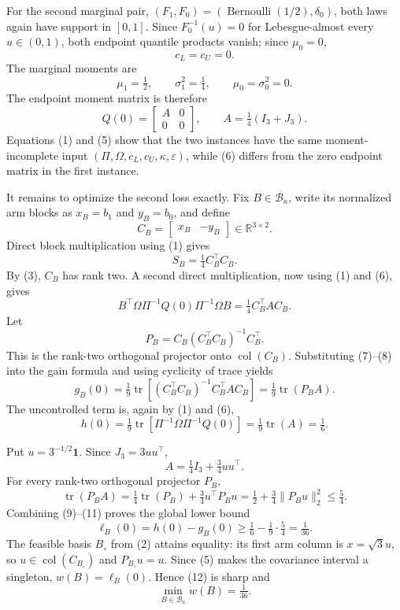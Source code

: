 For the second marginal pair, \((F_1,F_0)=(\operatorname{Bernoulli}(1/2),\delta_0)\), both laws again have support in \([0,1]\).  Since \(F_0^{-1}(u)=0\) for Lebesgue-almost every \(u\in(0,1)\), both endpoint quantile products vanish; since \(\mu_0=0\),
\[
c_L=c_U=0.
\tag{5}
\]
The marginal moments are
\[
\mu_1=\tfrac12,
\qquad
\sigma_1^2=\tfrac14,
\qquad
\mu_0=\sigma_0^2=0.
\]
The endpoint moment matrix is therefore
\[
Q(0)=\begin{bmatrix}A&0\\0&0\end{bmatrix},
\qquad
A=\tfrac14(I_3+J_3).
\tag{6}
\]
Equations (1) and (5) show that the two instances have the same moment-incomplete input \((\Pi,\Omega,c_L,c_U,\kappa,\varepsilon)\), while (6) differs from the zero endpoint matrix in the first instance.

It remains to optimize the second loss exactly.  Fix \(B\in\mathcal B_\kappa\), write its normalized arm blocks as \(x_B=b_1\) and \(y_B=b_0\), and define
\[
C_B=\begin{bmatrix}x_B&-y_B\end{bmatrix}\in\mathbb R^{3\times2}.
\]
Direct block multiplication using (1) gives
\[
S_B=\tfrac14C_B^{\top}C_B.
\tag{7}
\]
By (3), \(C_B\) has rank two.  A second direct multiplication, now using (1) and (6), gives
\[
B^{\top}\Omega\Pi^{-1}Q(0)\Pi^{-1}\Omega B
=\tfrac14C_B^{\top}AC_B.
\tag{8}
\]
Let
\[
P_B=C_B(C_B^{\top}C_B)^{-1}C_B^{\top}.
\]
This is the rank-two orthogonal projector onto \(\operatorname{col}(C_B)\).  Substituting (7)--(8) into the gain formula and using cyclicity of trace yields
\[
g_B(0)
=\tfrac19\operatorname{tr}\!\left[(C_B^{\top}C_B)^{-1}C_B^{\top}AC_B\right]
=\tfrac19\operatorname{tr}(P_BA).
\tag{9}
\]
The uncontrolled term is, again by (1) and (6),
\[
h(0)
=\tfrac19\operatorname{tr}\!\left[\Pi^{-1}\Omega\Pi^{-1}Q(0)\right]
=\tfrac19\operatorname{tr}(A)
=\tfrac16.
\tag{10}
\]

Put \(u=3^{-1/2}\mathbf1\).  Since \(J_3=3uu^{\top}\),
\[
A=\tfrac14I_3+\tfrac34uu^{\top}.
\]
For every rank-two orthogonal projector \(P_B\),
\[
\operatorname{tr}(P_BA)
=\tfrac14\operatorname{tr}(P_B)+\tfrac34u^{\top}P_Bu
=\tfrac12+\tfrac34\lVert P_Bu\rVert_2^2
\le\tfrac54.
\tag{11}
\]
Combining (9)--(11) proves the global lower bound
\[
\ell_B(0)=h(0)-g_B(0)
\ge\tfrac16-\tfrac19\cdot\tfrac54
=\tfrac1{36}.
\tag{12}
\]
The feasible basis \(B_\circ\) from (2) attains equality: its first arm column is \(x=\sqrt3u\), so \(u\in\operatorname{col}(C_{B_\circ})\) and \(P_{B_\circ}u=u\).  Since (5) makes the covariance interval a singleton, \(w(B)=\ell_B(0)\).  Hence (12) is sharp and
\[
\min_{B\in\mathcal B_\kappa}w(B)=\tfrac1{36}.
\tag{13}
\]

